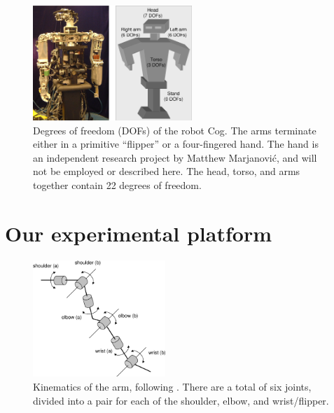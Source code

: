 
\begin{figure}[tbh]
\centerline{
\includegraphics[width=6.0cm]{cog-schematic.eps}
}
\caption{ 
%
  Degrees of freedom (DOFs) of the robot Cog.  The arms terminate
  either in a primitive ``flipper'' or a four-fingered hand.  
\ifverbose
The hand
  is an independent research project by Matthew Marjanovi\'{c}, and
  will not be employed or described here.  
\fi
  The head, torso, and arms
  together contain 22 degrees of freedom.
%
}
\label{fig:cog-schematic}
\end{figure}

\section{Our experimental platform}



\ifverbose
%
\begin{figure}[tbh]
\begin{center}
\includegraphics[width=5.0cm]{arm-motors.eps}
\caption{ 
\label{fig:arm-motors}
%
Kinematics of the arm, following \protect\cite{williamson99robot}.
There are a total of six joints, divided into a pair for each of
the shoulder, elbow, and wrist/flipper.
%
}
\end{center}
\end{figure}
%
\fi

